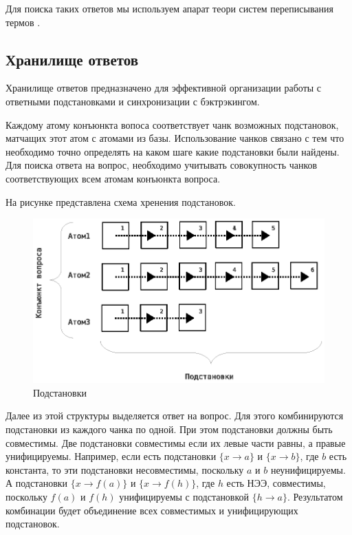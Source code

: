 Для поиска таких ответов мы используем апарат теори систем переписывания термов \cite{Nipkow}.



\subsection{Хранилище ответов}
Хранилище ответов предназначено для эффективной организации работы с ответными подстановками и синхронизации с бэктрэкингом.

Каждому атому конъюнкта вопоса соответствует чанк возможных подстановок, матчащих этот атом с атомами из базы. Использование чанков связано с тем что необходимо точно определять на каком шаге какие подстановки были найдены. Для поиска ответа на вопрос, необходимо учитывать совокупность чанков соответствующих всем атомам конъюнкта вопроса.

На рисунке представлена схема хренения подстановок. 

\begin{figure}[h]
	\centering
	\includegraphics[width=0.6\linewidth]{pics/AnBase.eps}
	\caption{Подстановки}
	\label{fig:anbase}
\end{figure}

Далее из этой структуры выделяется ответ на вопрос. Для этого комбинируются подстановки из каждого чанка по одной. При этом подстановки должны быть совместимы. Две подстановки совместимы если их левые части равны, а правые унифицируемы. Например, если есть подстановки $\{x \rightarrow a\}$ и $\{x \rightarrow b\}$, где $b$ есть константа, то эти подстановки несовместимы, поскольку $a$ и $b$ неунифицируемы. А подстановки $\{x \rightarrow f(a)\}$ и $\{x \rightarrow f(h)\}$, где $h$ есть НЭЭ, совместимы, поскольку $f(a)$ и $f(h)$ унифицируемы с подстановкой $\{h \rightarrow a\}$. Результатом комбинации будет объединение всех совместимых и унифицирующих подстановок.

